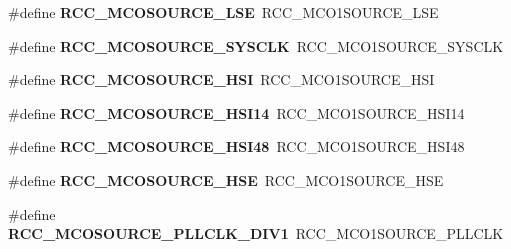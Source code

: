 \begin{DoxyCompactItemize}
\item 
\mbox{\label{group___h_a_l___r_c_c___aliased_ga830cfeba85393f5a5a2743ad0f373834}} 
\#define {\bfseries R\+C\+C\+\_\+\+M\+C\+O\+S\+O\+U\+R\+C\+E\+\_\+\+L\+SE}~R\+C\+C\+\_\+\+M\+C\+O1\+S\+O\+U\+R\+C\+E\+\_\+\+L\+SE
\item 
\mbox{\label{group___h_a_l___r_c_c___aliased_ga250215c0f82d63c001f1a19f6baeaee4}} 
\#define {\bfseries R\+C\+C\+\_\+\+M\+C\+O\+S\+O\+U\+R\+C\+E\+\_\+\+S\+Y\+S\+C\+LK}~R\+C\+C\+\_\+\+M\+C\+O1\+S\+O\+U\+R\+C\+E\+\_\+\+S\+Y\+S\+C\+LK
\item 
\mbox{\label{group___h_a_l___r_c_c___aliased_gaf76c21fc91d02a5006b1ad20bb09fb59}} 
\#define {\bfseries R\+C\+C\+\_\+\+M\+C\+O\+S\+O\+U\+R\+C\+E\+\_\+\+H\+SI}~R\+C\+C\+\_\+\+M\+C\+O1\+S\+O\+U\+R\+C\+E\+\_\+\+H\+SI
\item 
\mbox{\label{group___h_a_l___r_c_c___aliased_gaf44dc4cc77e850c96fc1fee93a74a838}} 
\#define {\bfseries R\+C\+C\+\_\+\+M\+C\+O\+S\+O\+U\+R\+C\+E\+\_\+\+H\+S\+I14}~R\+C\+C\+\_\+\+M\+C\+O1\+S\+O\+U\+R\+C\+E\+\_\+\+H\+S\+I14
\item 
\mbox{\label{group___h_a_l___r_c_c___aliased_ga31f756beeaf0bcc8082ec46ff42cfb2c}} 
\#define {\bfseries R\+C\+C\+\_\+\+M\+C\+O\+S\+O\+U\+R\+C\+E\+\_\+\+H\+S\+I48}~R\+C\+C\+\_\+\+M\+C\+O1\+S\+O\+U\+R\+C\+E\+\_\+\+H\+S\+I48
\item 
\mbox{\label{group___h_a_l___r_c_c___aliased_ga4e6a5a2c5b38b11470c34f9adc4adb5a}} 
\#define {\bfseries R\+C\+C\+\_\+\+M\+C\+O\+S\+O\+U\+R\+C\+E\+\_\+\+H\+SE}~R\+C\+C\+\_\+\+M\+C\+O1\+S\+O\+U\+R\+C\+E\+\_\+\+H\+SE
\item 
\mbox{\label{group___h_a_l___r_c_c___aliased_ga962bbca249325c15747b0b49c47a378c}} 
\#define {\bfseries R\+C\+C\+\_\+\+M\+C\+O\+S\+O\+U\+R\+C\+E\+\_\+\+P\+L\+L\+C\+L\+K\+\_\+\+D\+I\+V1}~R\+C\+C\+\_\+\+M\+C\+O1\+S\+O\+U\+R\+C\+E\+\_\+\+P\+L\+L\+C\+LK
\item 
\mbox{\label{group___h_a_l___r_c_c___aliased_ga8f2e0c2303a5c5c53a64a60f6900b09e}} 

\end{DoxyCompactItemize}
